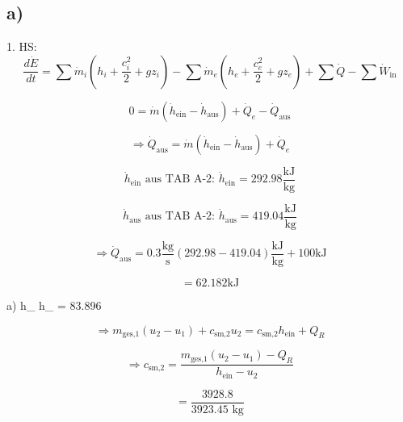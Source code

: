 

\subsection*{a)}

1. HS:
\[
\frac{d\dot{E}}{dt} = \sum \dot{m}_i \left( h_i + \frac{c_i^2}{2} + g z_i \right) - \sum \dot{m}_e \left( h_e + \frac{c_e^2}{2} + g z_e \right) + \sum \dot{Q} - \sum \dot{W}_{\text{in}}
\]

\[
0 = \dot{m} (\dot{h}_{\text{ein}} - \dot{h}_{\text{aus}}) + \dot{Q}_e - \dot{Q}_{\text{aus}}
\]

\[
\Rightarrow \dot{Q}_{\text{aus}} = \dot{m} (\dot{h}_{\text{ein}} - \dot{h}_{\text{aus}}) + \dot{Q}_e
\]

\[
\dot{h}_{\text{ein}} \text{ aus TAB A-2: } \dot{h}_{\text{ein}} = 292.98 \frac{\text{kJ}}{\text{kg}}
\]

\[
\dot{h}_{\text{aus}} \text{ aus TAB A-2: } \dot{h}_{\text{aus}} = 419.04 \frac{\text{kJ}}{\text{kg}}
\]

\[
\Rightarrow \dot{Q}_{\text{aus}} = 0.3 \frac{\text{kg}}{\text{s}} \left( 292.98 - 419.04 \right) \frac{\text{kJ}}{\text{kg}} + 100 \text{kJ}
\]

\[
= 62.182 \text{kJ}
\]

a)  \quad h_{}  \quad h_{} = 83.896 

\[
\Rightarrow m_{\text{ges,1}} (u_2 - u_1) + c_{\text{sm,2}} u_2 = c_{\text{sm,2}} h_{\text{ein}} + Q_R
\]

\[
\Rightarrow c_{\text{sm,2}} = \frac{m_{\text{ges,1}} (u_2 - u_1) - Q_R}{h_{\text{ein}} - u_2}
\]

\[
= \frac{3928.8}{3923.45 \text{ kg}}
\]